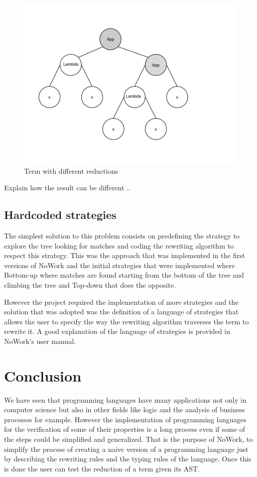 \documentclass[12pt,a4paper]{article}
\begin{document}
\begin{figure}[!h]
\includegraphics[scale=0.4]{multiple-reductions.png}

\caption{Term with different reductions}
\end{figure}

Explain how the result can be different ..

\subsection{Hardcoded strategies}

The simplest solution to this problem consists on predefining the
strategy to explore the tree looking for matches and coding the
rewriting algorithm to respect this strategy. This was the approach
that was implemented in the first versions of NoWork and the initial
strategies that were implemented where Bottom-up where matches are
found starting from the bottom of the tree and climbing the tree and
Top-down that does the opposite.

However the project required the implementation of more
strategies and the solution that was adopted was the definition of a
language of strategies that allows the user to specify the way the
rewriting algorithm traverses the term to rewrite it. A good
explanation of the language of strategies is provided in NoWork's user
manual. 
\section{Conclusion}

We have seen that programming languages have many applications not
only in computer science but also in other fields like logic and the
analysis of business processes for example. However the implementation
of programming languages for the verification of some of their
properties is a long process even if some of the steps could be
simplified and generalized. That is the purpose of NoWork, to simplify
the process of creating a naive version of a programming language just
by describing the rewriting rules and the typing rules of the
language. Once this is done the user can test the reduction of a term
given its AST.
\end{document}
